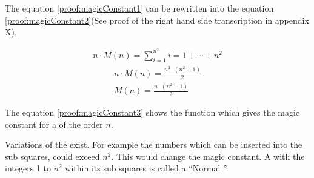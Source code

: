 The equation \ref{proof:magicConstant1} can be rewritten into the equation \ref{proof:magicConstant2}(See proof of the right hand side transcription in appendix X).

\begin{align}
\label{proof:magicConstant1}
	n \cdot M \left( n \right) = \sum ^{n^2}_{i = 1} i = 1 + \cdots + n^2
\end{align}
\begin{align}
\label{proof:magicConstant2}
	n \cdot M \left( n \right) = \frac{n^2 \cdot \left( n^2 + 1 \right)}{2} \\
\label{proof:magicConstant3}
	M \left( n \right) = \frac{n \cdot \left( n^2 + 1 \right)}{2} 
\end{align}

The equation \ref{proof:magicConstant3} shows the function which gives the magic constant for a \msquare{} of the order $n$.

Variations of the \msquare{} exist. For example the numbers which can be inserted into the sub squares, could exceed $n^2$. This would change the magic constant. A \msquare with the integers 1 to $n^2$ within its sub squares is called a ``Normal \msquare''.